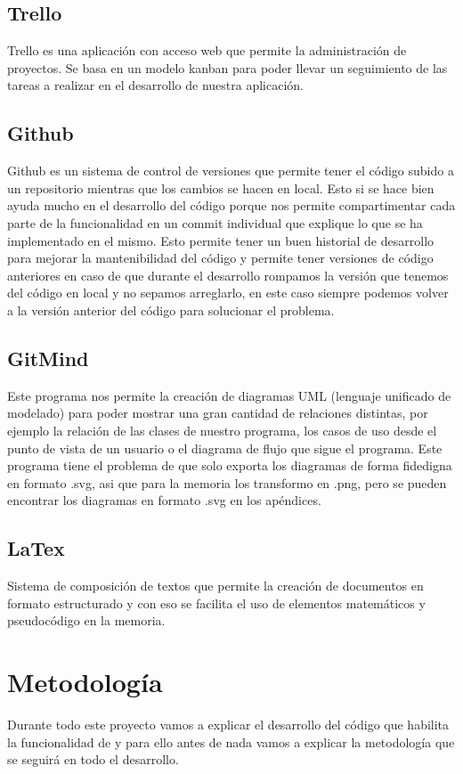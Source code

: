 \documentclass[12pt,a4paper]{article}
\begin{document}
\subsection{Trello}
Trello es una aplicación con acceso web que permite la administración de proyectos. Se basa en un modelo kanban para poder llevar un seguimiento de las tareas a realizar en el desarrollo de nuestra aplicación.\\
\subsection{Github}
Github es un sistema de control de versiones que permite tener el código subido a un repositorio mientras que los cambios se hacen en local. Esto si se hace bien ayuda mucho en el desarrollo del código porque nos permite compartimentar cada parte de la funcionalidad en un commit individual que explique lo que se ha implementado en el mismo. Esto permite tener un buen historial de desarrollo para mejorar la mantenibilidad del código y permite tener versiones de código anteriores en caso de que durante el desarrollo rompamos la versión que tenemos del código en local y no sepamos arreglarlo, en este caso siempre podemos volver a la versión anterior del código para solucionar el problema.\\
\subsection{GitMind}
Este programa nos permite la creación de diagramas UML (lenguaje unificado de modelado) para poder mostrar una gran cantidad de relaciones distintas, por ejemplo la relación de las clases de nuestro programa, los casos de uso desde el punto de vista de un usuario o el diagrama de flujo que sigue el programa. Este programa tiene el problema de que solo exporta los diagramas de forma fidedigna en formato .svg, asi que para la memoria los transformo en .png, pero se pueden encontrar los diagramas en formato .svg en los apéndices.\\
\subsection{LaTex}
Sistema de composición de textos que permite  la creación de documentos en formato estructurado y con eso se facilita el uso de elementos matemáticos y pseudocódigo en la memoria.\\
\pagebreak

	\section{Metodología}
	Durante todo este proyecto vamos a explicar el desarrollo del código que habilita la funcionalidad de \cite{Princial} y para ello antes de nada vamos a explicar la metodología que se seguirá en todo el desarrollo.\\
\end{document}
